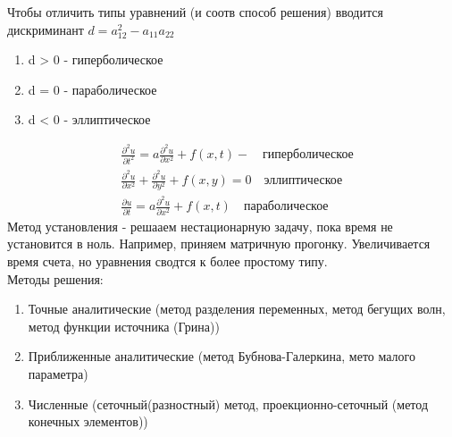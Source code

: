 \documentclass[12pt,a4paper]{article}
\begin{document}
	Чтобы отличить типы уравнений (и соотв способ решения) вводится дискриминант
	$d = a^2_{12} - a_{11}a_{22}$
	\begin{enumerate}
		\item d > 0 - гиперболическое
		\item d = 0 - параболическое
		\item d < 0 - эллиптическое
	\end{enumerate}
	\begin{align*}
	&\frac{\partial^2 u}{\partial t^2} = a \frac{\partial^2 u}{\partial x^2} + f(x,t) - \quad \text{гиперболическое}\\
	&\frac{\partial^2 u}{\partial x^2} + \frac{\partial^2 u}{\partial y^2} + f(x,y) = 0 \quad \text{эллиптическое}\\
	&\frac{\partial u }{\partial t}  = a \frac{\partial^2 u}{\partial x^2} + f(x,t) \quad \text{параболическое}
	\end{align*}
	Метод установления - решааем нестационарную задачу, пока время не установится в ноль. Например, приняем матричную прогонку. Увеличивается время счета, но уравнения сводтся к более простому типу. \\
	Методы решения:
	\begin{enumerate}
		\item Точные аналитические (метод разделения переменных, метод бегущих волн, метод функции источника (Грина))
		\item Приближенные аналитические (метод Бубнова-Галеркина, мето малого параметра)
		\item Численные (сеточный(разностный) метод, проекционно-сеточный (метод конечных элементов))
	\end{enumerate}
\end{document}
